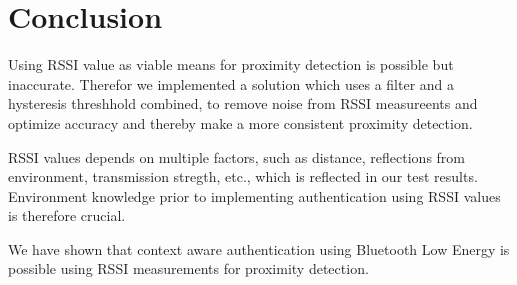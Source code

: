 \section{Conclusion}
Using RSSI value as viable means for proximity detection is possible but inaccurate. Therefor we implemented a solution which uses a filter and a hysteresis threshhold combined, to remove noise from RSSI measureents and optimize accuracy and thereby make a more consistent proximity detection.

RSSI values depends on multiple factors, such as distance, reflections from environment, transmission stregth, etc., which is reflected in our test results. Environment knowledge prior to implementing authentication using RSSI values is therefore crucial.

%

We have shown that context aware authentication using Bluetooth Low Energy is possible using RSSI measurements for proximity detection.